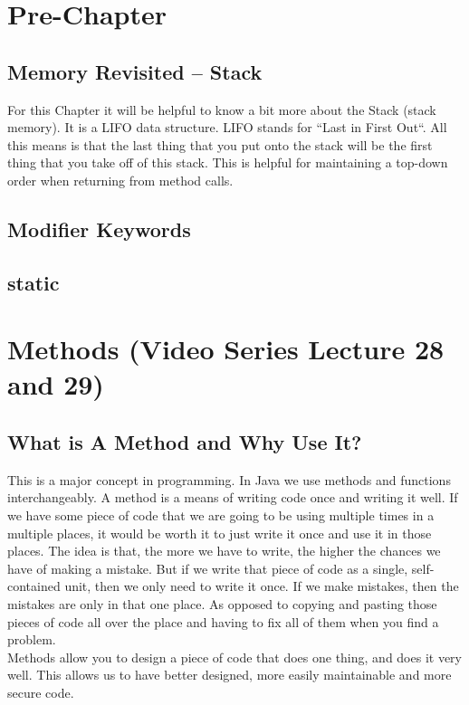 \documentclass[11]{article}
\begin{document}
\section{Pre-Chapter}
\subsection{Memory Revisited -- Stack}
For this Chapter it will be helpful to know a bit more about the Stack (stack memory). It is a LIFO data structure. LIFO stands for ``Last in First Out``. All this means is that the last thing that you put onto the stack will be the first thing that you take off of this stack. This is helpful for maintaining a top-down order when returning from method calls.

\subsection{Modifier Keywords}
\label{sec:mods}
\subsection{static}

\section{Methods (Video Series Lecture 28 and 29)}
\subsection{What is A Method and Why Use It?}
This is a major concept in programming. In Java we use methods and functions interchangeably. A method is a means of writing code once and writing it well. If we have some piece of code that we are going to be using multiple times in a multiple places, it would be worth it to just write it once and use it in those places. The idea is that, the more we have to write, the higher the chances we have of making a mistake. But if we write that piece of code as a single, self-contained unit, then we only need to write it once. If we make mistakes, then the mistakes are only in that one place. As opposed to copying and pasting those pieces of code all over the place and having to fix all of them when you find a problem.\\

Methods allow you to design a piece of code that does one thing, and does it very well. This allows us to have better designed, more easily maintainable and more secure code.\\
\end{document}
